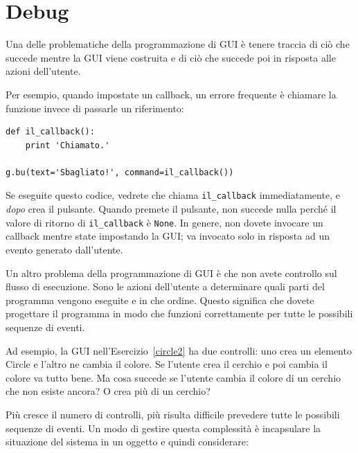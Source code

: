 \documentclass[10pt]{book}
\begin{document}
\section{Debug}

Una delle problematiche della programmazione di GUI è tenere traccia di ciò che succede mentre la GUI viene costruita e di ciò che succede poi in risposta alle azioni dell'utente.

Per esempio, quando impostate un callback, un errore frequente è chiamare la funzione invece di passarle un riferimento:

\begin{verbatim}
def il_callback():
    print 'Chiamato.'

g.bu(text='Sbagliato!', command=il_callback())
\end{verbatim}
%
Se eseguite questo codice, vedrete che chiama \verb"il_callback"
immediatamente, e {\em dopo} crea il pulsante. Quando premete il pulsante, non succede nulla perché il valore di ritorno di \verb"il_callback" è {\tt None}.
In genere, non dovete invocare un callback mentre state impostando la GUI; va invocato solo in risposta ad un evento generato dall'utente.

Un altro problema della programmazione di GUI è che non avete controllo sul flusso di esecuzione. Sono le azioni dell'utente a determinare quali parti del programma vengono eseguite e in che ordine. Questo significa che dovete progettare il programma in modo che funzioni correttamente per tutte le possibili sequenze di eventi.

Ad esempio, la GUI nell'Esercizio~\ref{circle2} ha due controlli: uno crea un elemento Circle e l'altro ne cambia il colore. Se l'utente crea il cerchio e poi cambia il colore va tutto bene. Ma cosa succede se l'utente cambia il colore di un cerchio che non esiste ancora? O crea più di un cerchio?

Più cresce il numero di controlli, più risulta difficile prevedere tutte le possibili sequenze di eventi. Un modo di gestire questa complessità è incapsulare la situazione del sistema in un oggetto e quindi considerare:
\end{document}
